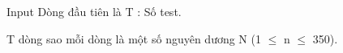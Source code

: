 Input
Dòng đầu tiên là T : Số test.  

   T dòng sao mỗi dòng là một số nguyên dương N (1 $\le$ n  $\le$ 350).